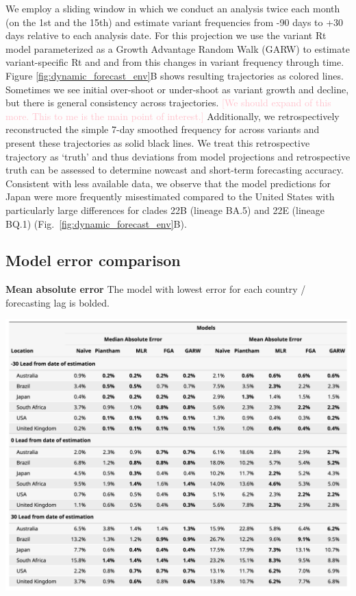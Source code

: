 \documentclass[11pt,oneside,letterpaper]{article}
\def\mfc#1{\textcolor{pink}{[#1]}}
\begin{document}
We employ a sliding window in which we conduct an analysis twice each month (on the 1st and the 15th) and estimate variant frequencies from -90 days to +30 days relative to each analysis date.
For this projection we use the variant Rt model \cite{figgins2022sars} parameterized as a Growth Advantage Random Walk (GARW) to estimate variant-specific Rt and and from this changes in variant frequency through time.
Figure \ref{fig:dynamic_forecast_env}B shows resulting trajectories as colored lines.
Sometimes we see initial over-shoot or under-shoot as variant growth and decline, but there is general consistency across trajectories.
\mfc{We should expand of this more. This to me is the main point of interest.}
Additionally, we retrospectively reconstructed the simple 7-day smoothed frequency for across variants and present these trajectories as solid black lines.
We treat this retrospective trajectory as `truth' and thus deviations from model projections and retrospective truth can be assessed to determine nowcast and short-term forecasting accuracy.
Consistent with less available data, we observe that the model predictions for Japan were more frequently misestimated compared to the United States with particularly large differences for clades 22B (lineage BA.5) and 22E (lineage BQ.1) (Fig.~\ref{fig:dynamic_forecast_env}B).

\subsection*{Model error comparison}

\begin{table}[tb!]
	\centering
	\caption{
		\textbf{Mean absolute error}
		The model with lowest error for each country / forecasting lag is bolded.
		}
	\includegraphics[width=1\textwidth]{figures/model_comp_table.png}
	\label{table:model_comp_table}
\end{table}
\end{document}
